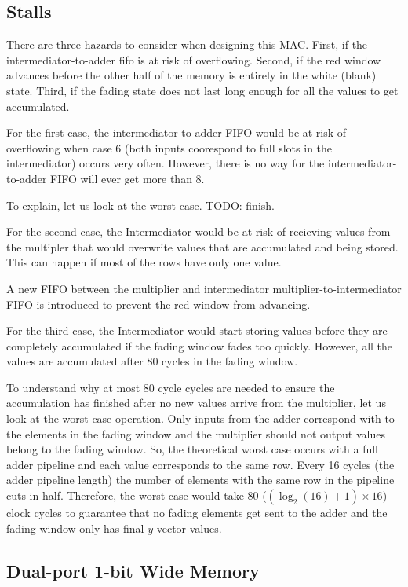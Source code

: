 \subsection{Stalls}
There are three hazards to consider when designing this MAC. First, if the intermediator-to-adder fifo is at risk of overflowing. Second, if the red window advances before the other half of the memory is entirely in the white (blank) state. Third, if the fading state does not last long enough for all the values to get accumulated.

For the first case, the intermediator-to-adder FIFO would be at risk of overflowing when case 6 (both inputs coorespond to full slots in the intermediator) occurs very often. However, there is no way for the intermediator-to-adder FIFO will ever get more than 8.

To explain, let us look at the worst case. TODO: finish.

For the second case, the Intermediator would be at risk of recieving values from the multipler that would overwrite values that are accumulated and being stored. This can happen if most of the rows have only one value.

A new FIFO between the multiplier and intermediator multiplier-to-intermediator FIFO is introduced to prevent the red window from advancing.

For the third case, the Intermediator would start storing values before they are completely accumulated if the fading window fades too quickly. However, all the values are accumulated after 80 cycles in the fading window.

\par To understand why at most 80 cycle cycles are needed to ensure the accumulation has finished after no new values arrive from the multiplier, let us look at the worst case operation. Only inputs from the adder correspond with to the elements in the fading window and the multiplier should not output values belong to the fading window. So, the theoretical worst case occurs with a full adder pipeline and each value corresponds to the same row. Every 16 cycles (the adder pipeline length) the number of elements with the same row in the pipeline cuts in half. Therefore, the worst case would take 80 ($(\log_2(16) + 1) \times 16$) clock cycles to guarantee that no fading elements get sent to the adder and the fading window only has final $y$ vector values.

\subsection{Dual-port 1-bit Wide Memory}

